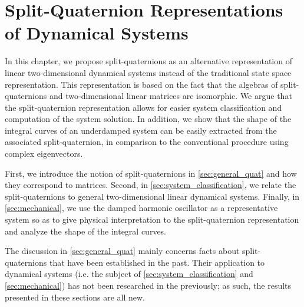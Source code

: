 \chapter{Split-Quaternion Representations of Dynamical Systems}
\label{chap:quaternion}
In this chapter, we propose split-quaternions as an alternative representation of linear two-dimensional dynamical systems instead of the traditional state space representation. This representation is based on the fact that the algebras of split-quaternions and two-dimensional linear matrices are isomorphic. We argue that the split-quaternion representation allows for easier system classification and computation of the system solution. In addition, we show that the shape of the integral curves of an underdamped system can be easily extracted from the associated split-quaternion, in comparison to the conventional procedure using complex eigenvectors.

First, we introduce the notion of split-quaternions in \cref{sec:general_quat} and how they correspond to matrices. Second, in \cref{sec:system_classification}, we relate the split-quaternions to general two-dimensional linear dynamical systems. Finally, in \cref{sec:mechanical}, we use the damped harmonic oscillator as a representative system so as to give physical interpretation to the split-quaternion representation and analyze the shape of the integral curves. 

The discussion in \cref{sec:general_quat} mainly concerns facts about split-quaternions that have been established in the past. Their application to dynamical systems (i.e. the subject of \cref{sec:system_classification} and \cref{sec:mechanical}) has not been researched in the previously; as such, the results presented in these sections are all new.





